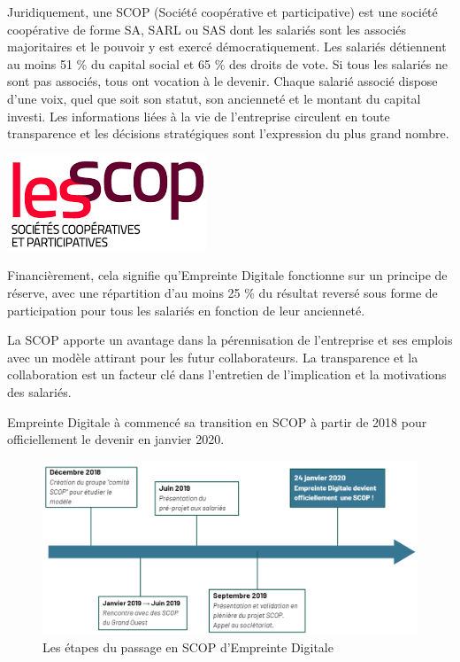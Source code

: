 \documentclass[12pt]{article}
\begin{document}
\noindent%
\begin{minipage}{.7\textwidth}%
Juridiquement, une SCOP (Société coopérative et participative) est une société coopérative de forme SA, SARL ou SAS dont les salariés sont les associés majoritaires et le pouvoir y est exercé démocratiquement.
Les salariés détiennent au moins 51 \% du capital social et 65 \% des droits de vote. 
Si tous les salariés ne sont pas associés, tous ont vocation à le devenir. 
Chaque salarié associé dispose d’une voix, quel que soit son statut, son ancienneté et le montant du capital investi.
Les informations liées à la vie de l’entreprise circulent en toute transparence et les décisions stratégiques sont l’expression du plus grand nombre.  \\
\end{minipage}%
\hfill
\begin{minipage}{.3\textwidth}%
\begin{center}
    \includegraphics[scale=0.7]{src/logo_scop.png}
\end{center}
\end{minipage}%

Financièrement, cela signifie qu'Empreinte Digitale fonctionne sur un principe de réserve, avec une répartition d'au moins 25 \% du résultat reversé sous forme de participation pour tous les salariés en fonction de leur ancienneté.

La SCOP apporte un avantage dans la pérennisation de l'entreprise et ses emplois avec un modèle attirant pour les futur collaborateurs. 
La transparence et la collaboration est un facteur clé dans l'entretien de l'implication et la motivations des salariés.

Empreinte Digitale à commencé sa transition en \gls{SCOP} à partir de 2018 pour officiellement le devenir en janvier 2020.
\begin{figure}[!ht]
    \centering
    \includegraphics[width=\textwidth]{src/transition_scop.png}
    \caption{Les étapes du passage en SCOP d'Empreinte Digitale}
    \label{fig:transition_scop}
\end{figure}
\end{document}

